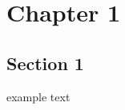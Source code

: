 \documentclass[../Thesis]{subfiles}
\begin{document}
\chapter{Chapter 1}
\section{Section 1}

example text 
\end{document}
